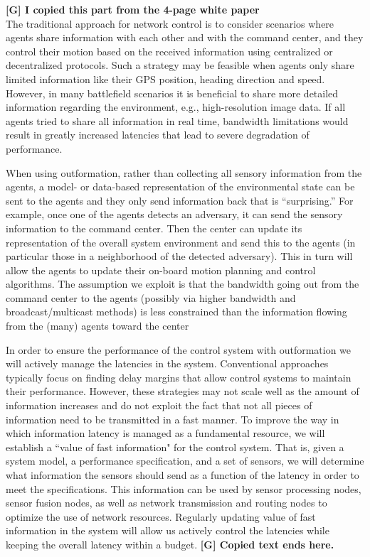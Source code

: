 \documentclass[12pt,letterpaper]{article}
\begin{document}
\textbf{[G] I copied this part from the 4-page white paper}\\ 
The traditional approach for network control is to consider scenarios where agents share information with each other and with the command center, and they control their motion based on the received information using centralized or decentralized protocols. Such a strategy may be feasible when agents only share limited information like their GPS position, heading direction and speed. However, in many battlefield scenarios it is beneficial to share more detailed information regarding the environment, e.g., high-resolution image data. If all agents tried to share all information in real time, bandwidth limitations would result in greatly increased latencies that lead to severe degradation of performance. 

When using outformation, rather than collecting all sensory information from the agents, a model- or data-based representation of the environmental state can be sent to the agents and they only send information back that is “surprising.” For example, once one of the agents detects an adversary, it can send the sensory information to the command center. Then the center can update its representation of the overall system environment and send this to the agents (in particular those in a neighborhood of the detected adversary). This in turn will allow the agents to update their on-board motion planning and control algorithms. The assumption we exploit is that the bandwidth going out from the command center to the agents (possibly via higher bandwidth and broadcast/multicast methods) is less constrained than the information flowing from the (many) agents toward the center 

In order to ensure the performance of the control system with outformation we will actively manage the latencies in the system. Conventional approaches typically focus on finding delay margins that allow control systems to maintain their performance. However, these strategies may not scale well as the amount of information increases and do not exploit the fact that not all pieces of information need to be transmitted in a fast manner. To improve the way in which information latency is managed as a fundamental resource, we will establish a ``value of fast information" for the control system. That is, given a system model, a performance specification, and a set of sensors, we will determine what information the sensors should send as a function of the latency in order to meet the specifications. This information can be used by sensor processing nodes, sensor fusion nodes, as well as network transmission and routing nodes to optimize the use of network resources. Regularly updating value of fast information in the system will allow us actively control the latencies while keeping the overall latency within a budget.
\textbf{[G] Copied text ends here.}
\end{document}
